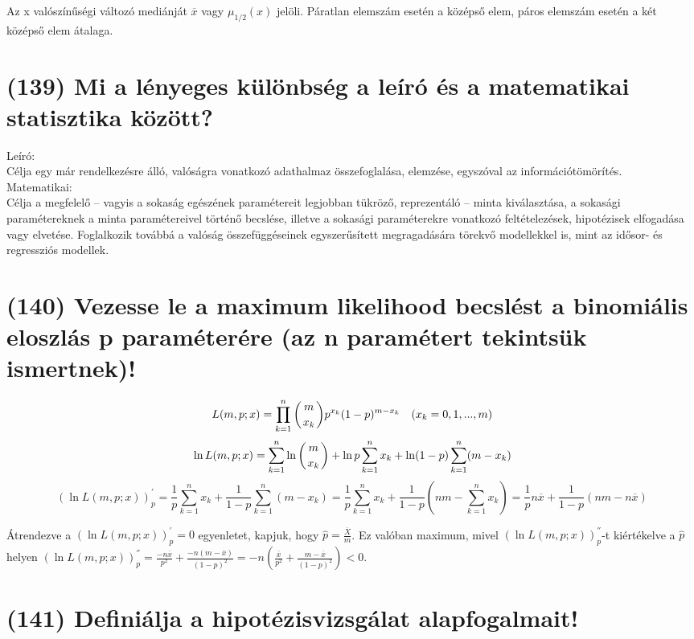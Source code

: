 \documentclass[12p]{article}
\begin{document}
Az x valószínűségi változó mediánját $\overline{x}$ vagy $\mu_{1/2}(x)$ jelöli.
Páratlan elemszám esetén a középső elem, páros elemszám esetén a két középső elem átalaga.

\section{(139) Mi a lényeges különbség a leíró és a matematikai statisztika között?}

Leíró:\\
Célja egy már rendelkezésre álló, valóságra vonatkozó adathalmaz összefoglalása, elemzése, egyszóval az információtömörítés.\\
Matematikai:\\
Célja a megfelelő – vagyis a sokaság egészének paramétereit legjobban tükröző, reprezentáló – minta kiválasztása, a sokasági paramétereknek a minta paramétereivel történő becslése, illetve a sokasági paraméterekre vonatkozó feltételezések, hipotézisek elfogadása vagy elvetése. Foglalkozik továbbá a valóság összefüggéseinek egyszerűsített megragadására törekvő modellekkel is, mint az idősor- és regressziós modellek.

\section{(140) Vezesse le a maximum likelihood becslést a binomiális eloszlás p paraméterére (az n paramétert tekintsük ismertnek)!}

$$L(m, p; x) = \prod_{k=1}^n \displaystyle{\left({m \atop x_k}\right)}p^{x_k}(1-p)^{m-x_k} \quad (x_k = 0, 1, ..., m)$$
$$\ln L(m, p; x) = \sum^n_{k=1} \ln \left ({m \atop x_k}\right) + \ln p \sum^n_{k=1} x_k + \ln(1-p) \sum^n_{k=1}(m-x_k)$$
$$(\ln L(m,p;x))^{'}_p = \frac{1}{p} \sum^n_{k=1}x_k + \frac{1}{1-p} \sum^n_{k=1} (m - x_k) = \frac{1}{p} \sum^n_{k=1}x_k + \frac{1}{1-p}
\left(nm- \sum^n_{k=1}x_k \right) = \frac{1}{p}n\overline{x} + \frac{1}{1-p}(nm-n\overline{x})$$

Átrendezve a $(\ln L(m,p;x))^{'}_p = 0$ egyenletet, kapjuk, hogy $\hat{p} = \frac{\overline{X}}{m}$.  Ez valóban maximum, mivel $(\ln L(m,p;x))^{''}_p$-t kiértékelve a $\hat{p}$ helyen $(\ln L(m,p;x))^{''}_p = \frac{-n \overline{x}}{p^2} + \frac{-n(m-\overline{x})}{(1-p)^2}=
-n\left(\frac{\overline{x}}{p^2}+\frac{m - \overline{x}}{(1-p)^2}\right)<0$.

\section{(141) Definiálja a hipotézisvizsgálat alapfogalmait!}
\end{document}
